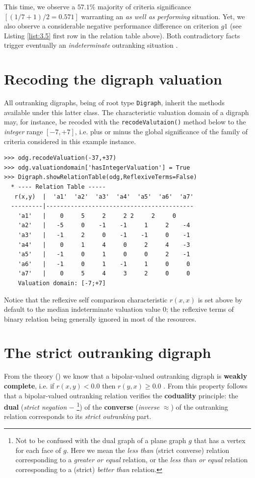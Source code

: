 This time, we observe a $57.1\%$ majority of criteria significance $[(1/7 + 1)/2 = 0.571]$ warranting an {\em as well as performing\/} situation. Yet, we also observe a considerable negative performance difference on criterion $g1$ (see Listing \ref{list:3.5} first row in the relation table above). Both contradictory facts trigger eventually an \emph{indeterminate} outranking situation \citep{BIS-2013}. 

\section{Recoding the digraph valuation}
\label{sec:3.4}

All outranking digraphs, being of root type {\tt Digraph}, inherit the methods available under this latter class. The characteristic valuation domain of a digraph may, for instance,  be recoded with the {\tt recodeValutaion()} method below to the {\em integer\/} range $[-7,+7]$, i.e. plus or minus the global significance of the family of criteria considered in this example instance.

\begin{lstlisting}[caption={Recoding the digraph valuation},label=list:3.7]
>>> odg.recodeValuation(-37,+37)
>>> odg.valuationdomain['hasIntegerValuation'] = True
>>> Digraph.showRelationTable(odg,ReflexiveTerms=False)
  * ---- Relation Table -----
   r(x,y)  |  'a1'  'a2'  'a3'  'a4'  'a5'  'a6'  'a7'	  
  ---------|------------------------------------------
    'a1'   |    0     5     2     2	2     2     0	 
    'a2'   |   -5     0    -1	 -1     1     2    -4	 
    'a3'   |   -1     2     0	 -1    -1     0    -1	 
    'a4'   |    0     1     4	  0     2     4    -3	 
    'a5'   |   -1     0     1	  0     0     2    -1	 
    'a6'   |   -1     0     1	 -1     1     0     0	 
    'a7'   |    0     5     4	  3     2     0     0	 
    Valuation domain: [-7;+7]
\end{lstlisting}

Notice that the reflexive self comparison characteristic $r(x,x)$ is set above by default to the median indeterminate valuation value $0$; the reflexive terms of binary relation being generally ignored in most of the  resources. 

\section{The strict outranking digraph}
\label{sec:3.5}

From the theory (\citep{BIS-2013, ADT-L7}) we know that a bipolar-valued outranking digraph is {\bf weakly complete}, i.e. if $r(x,y) < 0.0$ then $r(y,x) \geq 0.0$ . From this property follows that a bipolar-valued outranking relation verifies the {\bf coduality} principle: the {\bf dual} ({\em strict negation\/} $-$ \footnote{Not to be confused with the dual graph of a plane graph $g$ that has a vertex for each face of $g$. Here we mean the \emph{less than} (strict converse) relation corresponding to a \emph{greater or equal} relation, or the \emph{less than or equal} relation corresponding to a (strict) \emph{better than} relation.}) of the {\bf converse} ({\em inverse\/} $\approx$) of the outranking relation corresponds to its {\em strict outranking\/} part.

